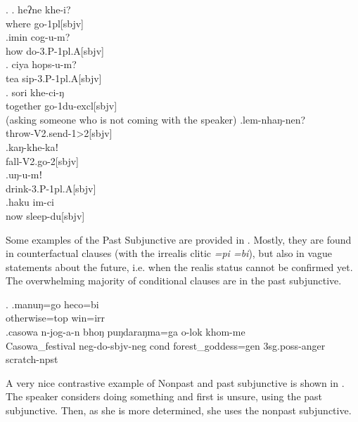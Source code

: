 \ex. \ag. heʔne khe-i?\\
		where go{\sc -1pl[sbjv]}	\\
	 \bg.imin cog-u-m?\\
 how do{\sc -3.P-1pl.A[sbjv]}\\
	 \bg. ciya hops-u-m?\\
		tea sip{\sc -3.P-1pl.A[sbjv]}	\\
	 \bg. sori khe-ci-ŋ\\
	together go{\sc -1du-excl[sbjv]}\\
	 (asking someone who is not coming with the speaker)
	\bg.lem-nhaŋ-nen?\\
  throw{\sc -V2.send-1>2[sbjv]}\\
  \bg.kaŋ-khe-kaǃ\\
 fall{\sc -V2.go-2[sbjv]}\\
  \bg.uŋ-u-mǃ\\
  drink{\sc -3.P-1pl.A[sbjv]}\\
  \bg.haku im-ci\\
  now sleep{\sc -du[sbjv]}\\
  
  Some examples of the Past  Subjunctive are provided in \Next. Mostly, they are found in counterfactual clauses (with the irrealis clitic \emph{=pi \ti =bi}), but also in vague statements about the future, i.e. when the realis status cannot be confirmed yet. The overwhelming majority of conditional clauses are in the past subjunctive.
  
  \ex. \ag.manuŋ=go heco=bi\\
  otherwise{\sc =top} win{\sc [3sg;sbjv]=irr}\\
  \bg.casowa           n-jog-a-n     bhoŋ puŋdaraŋma=ga      o-lok     khom-me\\
  Casowa\_festival {\sc neg-}do{\sc [3sg]-sbjv-neg} {\sc cond} forest\_goddess{\sc =gen} {\sc 3sg.poss-}anger scratch{\sc [3sg]-npst}\\
   
  
A very nice contrastive  example of  Nonpast and  past subjunctive is shown in \Next. The speaker considers doing something and first is unsure, using the past subjunctive. Then, as she is more determined, she uses the nonpast subjunctive.


